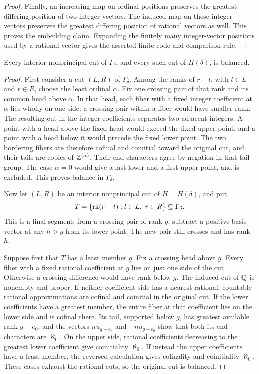 \begin{proof}
Finally, an increasing map on ordinal positions preserves the
greatest differing position of two integer vectors. The induced
map on these integer vectors preserves the greatest differing
position of rational vectors as well. This proves the embedding
claim. Expanding the finitely many integer-vector positions used
by a rational vector gives the asserted finite code and comparison
rule.
\end{proof}

\begin{lemma}
\label{found:balanced-cuts}
Every interior nonprincipal cut of $\Gamma_\delta$, and every such
cut of $H(\delta)$, is balanced.
\end{lemma}

\begin{proof}
First consider a cut $(L,R)$ of $\Gamma_\delta$. Among the ranks of
$r-l$, with $l\in L$ and $r\in R$, choose the least ordinal
$\alpha$. Fix one crossing pair of that rank and its common head
above $\alpha$. In that head, each fiber with a fixed integer
coefficient at $\alpha$ lies wholly on one side: a crossing pair
within a fiber would have smaller rank. The resulting cut in the
integer coefficients separates two adjacent integers. A point
with a head above the fixed head would exceed the fixed upper
point, and a point with a head below it would precede the fixed
lower point. The two bordering fibers are therefore cofinal
and coinitial toward the original cut, and their tails are
copies of $\mathbb Z^{(\alpha)}$. Their end
characters agree by negation in that tail group. The case
$\alpha=0$ would give a last lower and a first upper point, and
is excluded. This proves balance in $\Gamma_\delta$.

Now let $(L,R)$ be an interior nonprincipal cut of $H=H(\delta)$,
and put
\[
T=\{\operatorname{rk}(r-l):l\in L,\ r\in R\}\subseteq\Gamma_\delta.
\]
This is a final segment: from a crossing pair of rank $g$, subtract
a positive basis vector at any $h>g$ from its lower point. The new
pair still crosses and has rank $h$.

Suppose first that $T$ has a least member $g$. Fix a crossing head
above $g$. Every fiber with a fixed rational coefficient at $g$
lies on just one side of the cut. Otherwise a crossing difference
would have rank below $g$. The induced cut of $\mathbb Q$ is nonempty
and proper. If neither coefficient side has a nearest rational,
countable rational approximations are cofinal and coinitial in
the original cut. If the lower coefficients have a greatest
member, the entire fiber at that coefficient lies on the lower
side and is cofinal there. Its tail, supported below $g$, has
greatest available rank $g-e_0$, and the vectors
$n u_{g-e_0}$ and $-n u_{g-e_0}$ show that both its end characters
are $\aleph_0$. On the upper side, rational coefficients decreasing
to the greatest lower coefficient give coinitiality $\aleph_0$.
If instead the upper coefficients have a least member, the
reversed calculation gives cofinality and coinitiality
$\aleph_0$. These cases exhaust the rational cuts, so the original
cut is balanced.


\end{proof}
